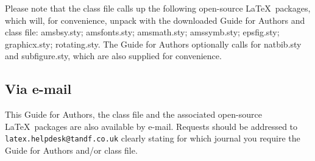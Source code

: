 \documentclass{nCSE2e}
\begin{document}
Please note that the class file calls up the following open-source \LaTeX\ packages, which will, for convenience,
unpack with the downloaded Guide for Authors and class file: amsbsy.sty; amsfonts.sty; amsmath.sty; amssymb.sty; epsfig.sty; graphicx.sty; rotating.sty. The Guide for Authors optionally calls for natbib.sty and subfigure.sty, which are also supplied for convenience.


\subsection{Via e-mail}

This Guide for Authors, the class file and the associated open-source \LaTeX\ packages are also available by
e-mail. Requests should be addressed to {\tt latex.helpdesk@tandf.co.uk} clearly stating for which journal you
require the Guide for Authors and/or class file.


\label{lastpage}
\end{document}
